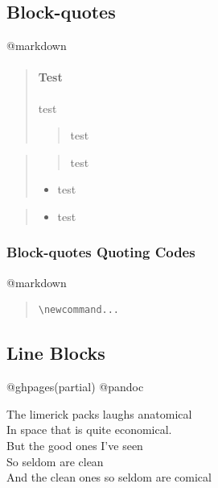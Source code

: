 \documentclass[]{article}
\providecommand{\tightlist}{%
  \setlength{\itemsep}{0pt}\setlength{\parskip}{0pt}}
\let\oldparagraph\paragraph
\renewcommand{\paragraph}[1]{\oldparagraph{#1}\mbox{}}
\begin{document}
\subsection{Block-quotes}\label{block-quotes}

@markdown

\begin{quote}
\mbox{}%
\paragraph{Test}\label{test}

test

\begin{quote}
test
\end{quote}
\end{quote}

\begin{quote}
\begin{quote}
test
\end{quote}

\begin{itemize}
\tightlist
\item
  test
\end{itemize}
\end{quote}

\begin{quote}
\begin{itemize}
\tightlist
\item
  test
\end{itemize}
\end{quote}

\subsubsection{Block-quotes Quoting
Codes}\label{block-quotes-quoting-codes}

@markdown

\begin{quote}
\begin{verbatim}
\newcommand...
\end{verbatim}
\end{quote}

\subsection{Line Blocks}\label{line-blocks}

@ghpages(partial) @pandoc

The limerick packs laughs anatomical\\
In space that is quite economical.\\
\hspace*{0.333em}\hspace*{0.333em}\hspace*{0.333em}But the good ones
I've seen\\
\hspace*{0.333em}\hspace*{0.333em}\hspace*{0.333em}So seldom are clean\\
And the clean ones so seldom are comical
\end{document}
